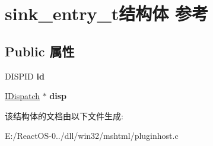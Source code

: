 \hypertarget{structsink__entry__t}{}\section{sink\+\_\+entry\+\_\+t结构体 参考}
\label{structsink__entry__t}
\subsection*{Public 属性}
\begin{DoxyCompactItemize}
\item 
\mbox{\label{structsink__entry__t_a57f6ef4bb4f9653f374bf38b47753454}} 
D\+I\+S\+P\+ID {\bfseries id}
\item 
\mbox{\label{structsink__entry__t_a6855498286b4bfd5612fbf0e32010909}} 
\hyperlink{interface_i_dispatch}{I\+Dispatch} $\ast$ {\bfseries disp}
\end{DoxyCompactItemize}


该结构体的文档由以下文件生成\+:\begin{DoxyCompactItemize}
\item 
E\+:/\+React\+O\+S-\/0../dll/win32/mshtml/pluginhost.\+c\end{DoxyCompactItemize}
